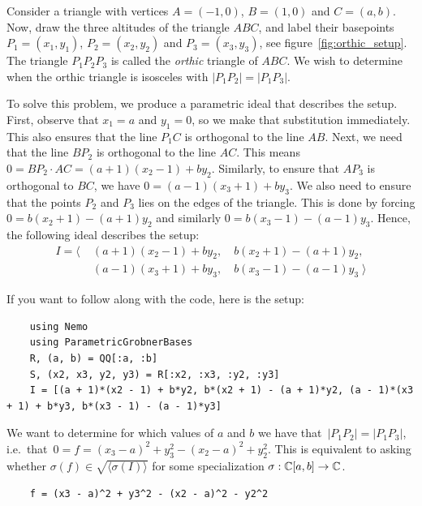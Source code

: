 \begin{example} \upshape
  Consider a triangle with vertices $A = (-1, 0)$, $B = (1, 0)$ and $C = (a, b)$. Now, draw the three altitudes of the triangle $ABC$, and label their basepoints $P_{1} = (x_{1}, y_{1})$, $P_{2} = (x_{2}, y_{2})$ and $P_{3} = (x_{3}, y_{3})$, see figure~\ref{fig:orthic_setup}. The triangle $P_{1}P_{2}P_{3}$ is called the \textit{orthic} triangle of $ABC$. We wish to determine when the orthic triangle is isosceles with $|P_{1}P_{2}| = |P_{1}P_{3}|$.

  To solve this problem, we produce a parametric ideal that describes the setup. First, observe that $x_{1} = a$ and $y_{1} = 0$, so we make that substitution immediately. This also ensures that the line $P_{1}C$ is orthogonal to the line $AB$. Next, we need that the line $BP_{2}$ is orthogonal to the line $AC$. This means $0 = BP_{2} \cdot AC = (a + 1)(x_{2} - 1) + b y_{2}$. Similarly, to ensure that $AP_{3}$ is orthogonal to $BC$, we have $0 = (a - 1)(x_{3} + 1) + b y_{3}$. We also need to ensure that the points $P_{2}$ and $P_{3}$ lies on the edges of the triangle. This is done by forcing $0 = b(x_{2} + 1) - (a + 1)y_{2}$ and similarly $0 = b(x_{3} - 1) - (a - 1)y_{3}$. Hence, the following ideal describes the setup:
  \begin{align*}
    I = \langle\; &(a + 1)(x_{2} - 1) + b y_{2}, \quad  b(x_{2} + 1) - (a + 1)y_{2}, \\
                  &(a - 1)(x_{3} + 1) + b y_{3}, \quad  b(x_{3} - 1) - (a - 1)y_{3} \; \rangle
  \end{align*}

  If you want to follow along with the code, here is the setup:
  \begin{verbatim}
    using Nemo
    using ParametricGrobnerBases
    R, (a, b) = QQ[:a, :b]
    S, (x2, x3, y2, y3) = R[:x2, :x3, :y2, :y3]
    I = [(a + 1)*(x2 - 1) + b*y2, b*(x2 + 1) - (a + 1)*y2, (a - 1)*(x3 + 1) + b*y3, b*(x3 - 1) - (a - 1)*y3]
  \end{verbatim}

  We want to determine for which values of $a$ and $b$ we have that $\,|P_{1} P_{2}| = |P_{1} P_{3}|$, i.e.\ that $\,0 = f = {(x_{3} - a)}^{2} + y_{3}^{2} - {(x_{2} - a)}^{2} + y_{2}^{2}$. This is equivalent to asking whether $\sigma(f) \in \sqrt{\langle \sigma(I) \rangle}$ for some specialization $\sigma : \mathbb{C}[a, b] \to \mathbb{C}$.

  \begin{verbatim}
    f = (x3 - a)^2 + y3^2 - (x2 - a)^2 - y2^2
  \end{verbatim}



\end{example}
